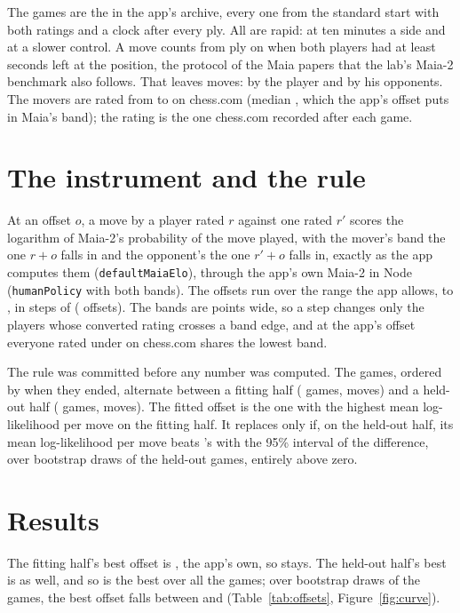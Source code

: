 \documentclass[11pt]{article}
\begin{document}
The games are the \Games{} in the app's archive, every one from the standard start with both
ratings and a clock after every ply. All are rapid: \TenMinuteGames{} at ten minutes a side and
\OtherGames{} at a slower control. A move counts from ply \MinPly{} on when both players had at least
\MinClock{} seconds left at the position, the protocol of the Maia papers that the lab's Maia-2
benchmark also follows. That leaves \Moves{} moves: \HimMoves{} by the player and \OppMoves{} by
his opponents. The movers are rated from \RatingMin{} to \RatingMax{} on chess.com (median
\RatingMedian, which the app's offset puts in Maia's \MedianBand{} band); the rating is the one
chess.com recorded after each game.

\section{The instrument and the rule}

At an offset $o$, a move by a player rated $r$ against one rated $r'$ scores the logarithm of
Maia-2's probability of the move played, with the mover's band the one $r + o$ falls in and the
opponent's the one $r' + o$ falls in, exactly as the app computes them (\texttt{defaultMaiaElo}),
through the app's own Maia-2 in Node (\texttt{humanPolicy} with both bands). The offsets run over
the range the app allows, \OffsetMin{} to \OffsetMax, in steps of \OffsetStep{} (\OffsetCount{}
offsets). The bands are \MaiaWidth{} points wide, so a step changes only the players whose
converted rating crosses a band edge, and at the app's offset everyone rated under
\LowestBelow{} on chess.com shares the lowest band.

The rule was committed before any number was computed. The games, ordered by when they ended,
alternate between a fitting half (\FitGames{} games, \FitMoves{} moves) and a held-out half
(\HeldGames{} games, \HeldMoves{} moves). The fitted offset is the one with the highest mean
log-likelihood per move on the fitting half. It replaces \AppOffset{} only if, on the held-out
half, its mean log-likelihood per move beats \AppOffset's with the 95\% interval of the
difference, over \Draws{} bootstrap draws of the held-out games, entirely above zero.

\section{Results}

The fitting half's best offset is \Fitted, the app's own, so \AppOffset{} stays. The held-out
half's best is \HeldBest{} as well, and so is the best over all the games; over \Draws{}
bootstrap draws of the games, the best offset falls between \BestAllLo{} and \BestAllHi{}
(Table~\ref{tab:offsets}, Figure~\ref{fig:curve}).
\end{document}
